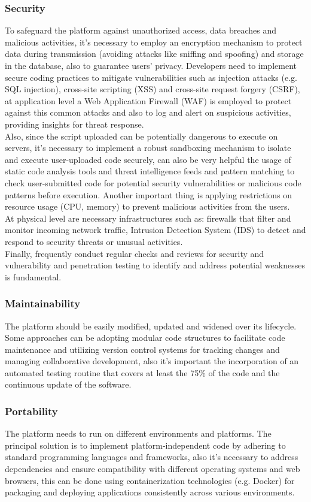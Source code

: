 \subsubsection{Security}
To safeguard the platform against unauthorized access, data breaches and malicious activities, it’s necessary to employ an encryption mechanism to protect data during transmission (avoiding attacks like sniffing and spoofing) and storage in the database, also to guarantee users’ privacy. Developers need to implement secure coding practices to mitigate vulnerabilities such as injection attacks (e.g. SQL injection), cross-site scripting (XSS) and cross-site request forgery (CSRF), at application level a Web Application Firewall (WAF) is employed to protect against this common attacks and also to log and alert on suspicious activities, providing insights for threat response. \\
Also, since the script uploaded can be potentially dangerous to execute on servers, it’s necessary to implement a robust sandboxing mechanism to isolate and execute user-uploaded code securely, can also be very helpful the usage of static code analysis tools and threat intelligence feeds and pattern matching to check user-submitted code for potential security vulnerabilities or malicious code patterns before execution. Another important thing is applying restrictions on resource usage (CPU, memory) to prevent malicious activities from the users. \\
At physical level are necessary infrastructures such as: firewalls that filter and monitor incoming network traffic, Intrusion Detection System (IDS) to detect and respond to security threats or unusual activities. \\
Finally, frequently conduct regular checks and reviews for security and vulnerability and penetration testing to identify and address potential weaknesses is fundamental.

\subsubsection{Maintainability}
The platform should be easily modified, updated and widened over its lifecycle. Some approaches can be adopting modular code structures to facilitate code maintenance and utilizing version control systems for tracking changes and managing collaborative development, also it’s important the incorporation of an automated testing routine that covers at least the 75\% of the code and the continuous update of the software.

\subsubsection{Portability}
The platform needs to run on different environments and platforms. The principal solution is to implement platform-independent code by adhering to standard programming languages and frameworks, also it’s necessary to address dependencies and ensure compatibility with different operating systems and web browsers, this can be done using containerization technologies (e.g. Docker) for packaging and deploying applications consistently across various environments.